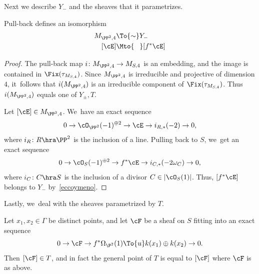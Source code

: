Next we describe $Y_-$ and the sheaves that it parametrizes.

\begin{prop}\label{prop:ypsilonmeno}
Pull-back defines an isomorphism
\begin{equation*}
\begin{aligned}
M_{\PP^2,4} & \To{\sim} Y_{-}\\
[\cE] & \Mto{\hphantom{\sim}}  [f^{*}\cE]
\end{aligned}
\end{equation*}
\end{prop}

\begin{proof}
The pull-back map $i\colon M_{\PP^2,4}\to M_{S,4}$ is an embedding, and the image is contained in $\Fix(\tau_{M_{S,4}})$. Since $M_{\PP^2,4}$ is irreducible and projective of dimension $4$, it~follows that $i(M_{\PP^2,4})$ is an irreducible component of $\Fix(\tau_{M_{S,4}})$. Thus $i(M_{\PP^2,4})$ equals one of $Y_{\pm},T$.

Let $[\cE]\in M_{\PP^2,4}$. We~have an exact sequence
\begin{equation*}
0\to \cO_{\PP^2}(-1)^{\oplus 2}\to \cE\to i_{R,*}(-2)\to 0,
\end{equation*}
where $i_R\colon R\hra\PP^2$ is the inclusion of a line. Pulling back to $S$, we~get
an exact sequence
\begin{equation*}
0\to \cO_{S}(-1)^{\oplus 2}\to f^{*}\cE\to i_{C,*}(-2\omega_C)\to 0,
\end{equation*}
where $i_C\colon C\hra S $ is the inclusion of a divisor $C\in|\cO_S(1)|$. Thus, $[f^{*}\cE]$ belongs to $Y_{-}$ by~\eqref{eccoymeno}.
\end{proof}

Lastly, we~deal with the sheaves parametrized by $T$.

\begin{prop}\label{prop:eccoti}
Let $x_1,x_2\in{\mathsf\Gamma}$ be distinct points, and let $\cF$ be a sheaf on $S$
fitting into an exact sequence
\begin{equation}\label{eccoeffe}
0\to \cF \to f^*\Omega_{\P^2}(1) \To{u} k(x_1)\oplus k(x_2)\to 0.
\end{equation}
Then $[\cF]\in T$, and in fact the general point of $T$ is equal to $[\cF]$ where $\cF$ is as above.
\end{prop}

